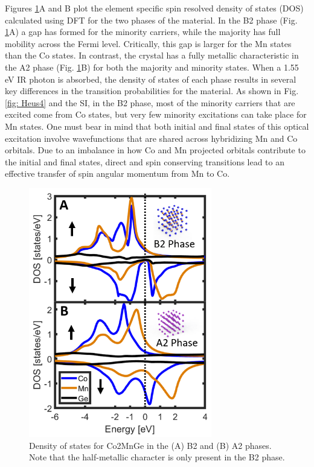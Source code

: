 Figures \ref{fig: Heus3}A and B plot the element specific spin resolved density of states (DOS) calculated using DFT for the two phases of the material. In the B2 phase (Fig. \ref{fig: Heus3}A) a gap has formed for the minority carriers, while the majority has full mobility across the Fermi level. Critically, this gap is larger for the Mn states than the Co states. In contrast, the crystal has a fully metallic characteristic in the A2 phase (Fig. \ref{fig: Heus3}B) for both the majority and minority states. When a 1.55 eV IR photon is absorbed, the density of states of each phase results in several key differences in the transition probabilities for the material. As shown in Fig. \ref*{fig: Heus4} and the SI, in the B2 phase, most of the minority carriers that are excited come from Co states, but very few minority excitations can take place for Mn states. One must bear in mind that both initial and final states of this optical excitation involve wavefunctions that are shared across hybridizing Mn and Co orbitals. Due to an imbalance in how Co and Mn projected orbitals contribute to the initial and final states, direct and spin conserving transitions lead to an effective transfer of spin angular momentum from Mn to Co. 

\begin{figure}
	\label{fig: Heus3}
	\begin{center}
		\includegraphics[width=80mm]{figs/Heus3}
	\end{center}
	\caption{Density of states for Co2MnGe in the (A) B2 and (B) A2 phases. Note that the half-metallic character is only present in the B2 phase. }
\end{figure}

